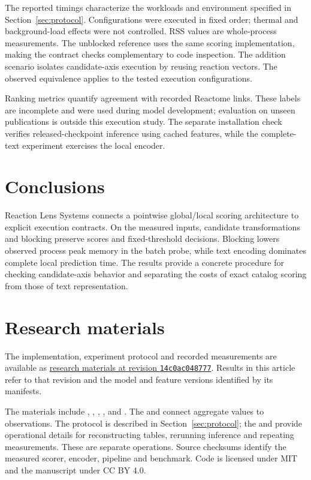 \documentclass[preprint,12pt,a4paper]{elsarticle}
\begin{document}
The reported timings characterize the workloads and environment specified in
Section~\ref{sec:protocol}. Configurations were executed in fixed order;
thermal and background-load effects were not controlled. RSS values are
whole-process measurements. The unblocked reference uses the same scoring
implementation, making the contract checks complementary to code inspection.
The addition scenario isolates candidate-axis execution by reusing reaction
vectors. The observed equivalence applies to the tested execution configurations.

Ranking metrics quantify agreement with recorded Reactome links. These labels
are incomplete and were used during model development; evaluation on unseen
publications is outside this execution study. The separate installation check
verifies released-checkpoint inference using cached features, while the
complete-text experiment exercises the local encoder.

\section{Conclusions}
Reaction Lens Systems connects a pointwise global/local scoring architecture to
explicit execution contracts. On the measured inputs, candidate transformations
and blocking preserve scores and fixed-threshold decisions. Blocking lowers
observed process peak memory in the batch probe, while text encoding dominates
complete local prediction time. The results provide a concrete procedure for
checking candidate-axis behavior and separating the costs of exact catalog
scoring from those of text representation.
\section*{Research materials}
The implementation, experiment protocol and recorded measurements are available
as \href{https://github.com/imrangadzhiev/reaction-lens-systems/tree/14c0ac048777396b121ea877df4f1a08df935a66}{research materials at revision \texttt{14c0ac048777}}.
Results in this article refer to that revision and the model and feature versions
identified by its manifests. 

The materials include ,
,
,
, and
.
The  and
 connect aggregate values to observations.
The protocol is described in Section~\ref{sec:protocol}; the
 and
 provide operational details for
reconstructing tables, rerunning inference and repeating measurements. These are
separate operations. Source checksums identify the measured scorer, encoder,
pipeline and benchmark. Code is licensed under MIT and the manuscript under
CC BY 4.0.
\end{document}
